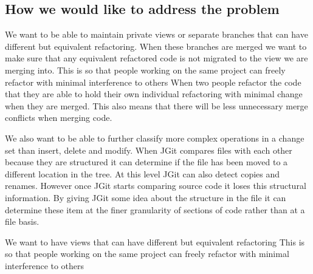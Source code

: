 
% 
% 

\subsection{How we would like to address the problem}
We want to be able to maintain private views or separate branches that can have different but equivalent refactoring.  When these branches are merged we want to make sure that any equivalent refactored code is not migrated to the view we are merging into.
This is so that people working on the same project can freely refactor with minimal interference to others
When two people refactor the code that they are able to hold their own individual refactoring with minimal change when they are merged.
This also means that there will be less unnecessary merge conflicts when merging code.

We also want to be able to further classify more complex operations in a change set than insert, delete and modify.  When JGit compares files with each other because they are structured it can determine if the file has been moved to a different location in the tree.  At this level JGit can also detect copies and renames.  However once JGit starts comparing source code it loses this structural information.  By giving JGit some idea about the structure in the file it can determine these item at the finer granularity of sections of code rather than at a file basis.

We want to have views that can have different but equivalent refactoring
This is so that people working on the same project can freely refactor with minimal interference to others











